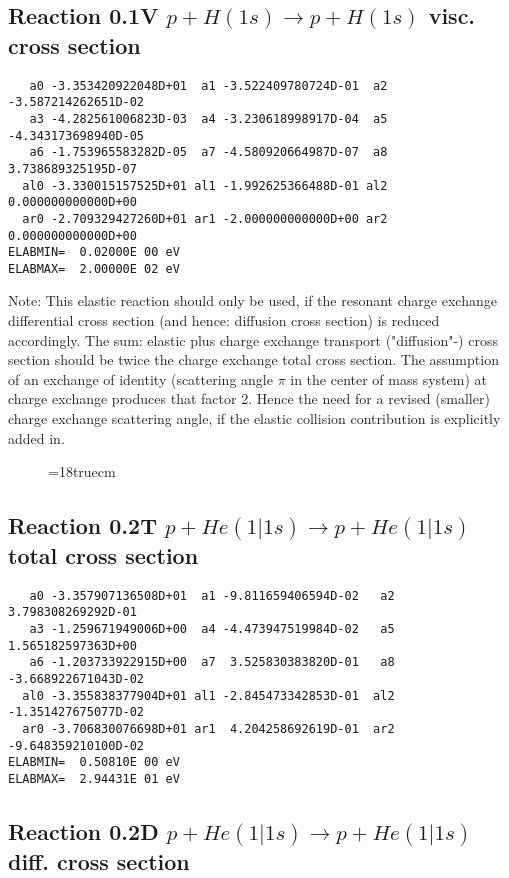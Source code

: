 \subsection{
Reaction 0.1V    $p + H (1s) \rightarrow p + H (1s)$ visc. cross section
}



\begin{verbatim}
   a0 -3.353420922048D+01  a1 -3.522409780724D-01  a2 -3.587214262651D-02
   a3 -4.282561006823D-03  a4 -3.230618998917D-04  a5 -4.343173698940D-05
   a6 -1.753965583282D-05  a7 -4.580920664987D-07  a8  3.738689325195D-07
  al0 -3.330015157525D+01 al1 -1.992625366488D-01 al2  0.000000000000D+00
  ar0 -2.709329427260D+01 ar1 -2.000000000000D+00 ar2  0.000000000000D+00
ELABMIN=  0.02000E 00 eV
ELABMAX=  2.00000E 02 eV
\end{verbatim}
Note: This elastic reaction should only be used, if the resonant charge
exchange differential cross section (and hence: diffusion cross section)
is reduced accordingly. The sum: elastic plus charge exchange transport
("diffusion"-) cross section should be twice the charge exchange total
cross section. The assumption of an exchange of identity (scattering
angle $\pi$ in the center of mass system) at charge exchange produces
that factor 2. Hence the need for a revised (smaller) charge exchange
scattering angle, if the elastic collision contribution is explicitly
added in.

\begin{figure} \label{0.1}
\epsfxsize=18truecm
\end{figure}
\newpage
\subsection{
Reaction 0.2T   $ p + He(1|1s) \rightarrow p + He (1|1s)$ total cross section
}



\begin{verbatim}
   a0 -3.357907136508D+01  a1 -9.811659406594D-02   a2  3.798308269292D-01
   a3 -1.259671949006D+00  a4 -4.473947519984D-02   a5  1.565182597363D+00
   a6 -1.203733922915D+00  a7  3.525830383820D-01   a8 -3.668922671043D-02
  al0 -3.355838377904D+01 al1 -2.845473342853D-01  al2 -1.351427675077D-02
  ar0 -3.706830076698D+01 ar1  4.204258692619D-01  ar2 -9.648359210100D-02
ELABMIN=  0.50810E 00 eV
ELABMAX=  2.94431E 01 eV
\end{verbatim}

\subsection{
Reaction 0.2D    $p + He(1|1s) \rightarrow p + He (1|1s) $diff. cross section
}


